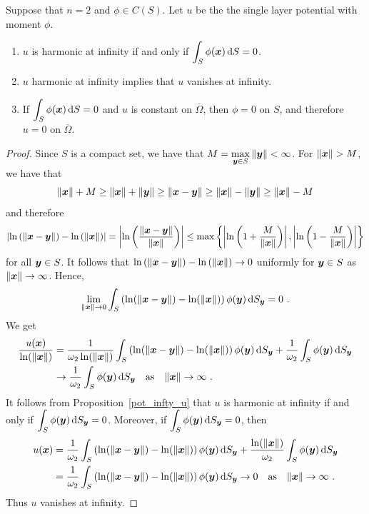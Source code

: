 \begin{lemma} \label{pot_1to1n2}
Suppose that $n=2$ and $\phi \in C(S)$.  Let $u$ be the
the single layer potential with moment $\phi$.
\begin{enumerate}
\item $u$ is harmonic at infinity if and only if
$\displaystyle \int_{S} \phi({\bm{x}}) \,\mathrm{d}{S} =0$.
\item $u$ harmonic at infinity implies that $u$ vanishes at infinity.
\item If $\displaystyle \int_{S} \phi({\bm{x}}) \,\mathrm{d}{S} =0$
and $u$ is constant on $\overline{\Omega}$, then $\phi=0$ on
$S$, and therefore $u=0$ on $\overline{\Omega}$.
\end{enumerate}
\end{lemma}

\begin{proof}
Since $S$ is a compact set, we have that
$\displaystyle M = \max_{{\bm{y}} \in S} \|{\bm{y}}\| < \infty$.
For $\|{\bm{x}}\| > M$, we have that
\[
\|{\bm{x}}\| + M \geq \|{\bm{x}}\| + \|{\bm{y}}\| \geq \|{\bm{x}} - {\bm{y}} \|
\geq \|{\bm{x}}\| - \|{\bm{y}}\|
\geq \|{\bm{x}}\| - M
\]
and therefore
\[
\left| \ln\left(\|{\bm{x}}-{\bm{y}}\|\right) -
\ln\left(\|{\bm{x}}\|\right) \right|
= \left| \ln\left(\frac{\|{\bm{x}}-{\bm{y}}\|}{\|{\bm{x}}\|}\right) \right|
\leq \max \left\{
\left| \ln\left(1 + \frac{M}{\|{\bm{x}}\|}\right) \right|,
\left| \ln\left(1 - \frac{M}{\|{\bm{x}}\|}\right) \right| \right\}
\]
for all ${\bm{y}} \in S$.   It follows that
$\ln\left(\|{\bm{x}}-{\bm{y}}\|\right) - \ln\left(\|{\bm{x}}\|\right) \to 0$
uniformly for ${\bm{y}} \in S$ as $\|{\bm{x}}\| \to \infty$.
Hence,
\[
\lim_{\|{\bm{x}}\|\to 0} \int_S \left( \ln(\|{\bm{x}}-{\bm{y}}\|) - \ln(\|{\bm{x}}\|)
\right) \phi({\bm{y}}) \,\mathrm{d}{S}_{{\bm{y}}} = 0 \ .
\]
We get
\begin{align*}
\frac{u({\bm{x}})}{\ln(\|{\bm{x}}\|)}
&= \frac{1}{\omega_2 \ln(\|{\bm{x}}\|)}
\int_S \left( \ln(\|{\bm{x}}-{\bm{y}}\|) - \ln(\|{\bm{x}}\|)
\right) \phi({\bm{y}}) \,\mathrm{d}{S}_{{\bm{y}}}
+ \frac{1}{\omega_2} \int_S \phi({\bm{y}}) \,\mathrm{d}{S}_{{\bm{y}}} \\
&\to \frac{1}{\omega_2} \int_S \phi({\bm{y}}) \,\mathrm{d}{S}_{{\bm{y}}}
\quad \text{as} \quad \|{\bm{x}}\| \to \infty \ .
\end{align*}
It follows from Proposition~\ref{pot_infty_u} that $u$ is harmonic at
infinity if and only if
$\displaystyle \int_S \phi({\bm{y}}) \,\mathrm{d}{S}_{{\bm{y}}} = 0$.
Moreover, if $\displaystyle \int_S \phi({\bm{y}}) \,\mathrm{d}{S}_{{\bm{y}}} = 0$, then
\begin{align*}
u({\bm{x}})
&= \frac{1}{\omega_2}
\int_S \left( \ln(\|{\bm{x}}-{\bm{y}}\|) - \ln(\|{\bm{x}}\|)
\right) \phi({\bm{y}}) \,\mathrm{d}{S}_{{\bm{y}}}
+ \frac{\ln(\|{\bm{x}}\|)}{\omega_2} \int_S \phi({\bm{y}}) \,\mathrm{d}{S}_{{\bm{y}}} \\
&= \frac{1}{\omega_2}
\int_S \left( \ln(\|{\bm{x}}-{\bm{y}}\|) - \ln(\|{\bm{x}}\|)
\right) \phi({\bm{y}}) \,\mathrm{d}{S}_{{\bm{y}}}
\to 0 \quad \text{as} \quad \|{\bm{x}}\| \to \infty \ .
\end{align*}
Thus $u$ vanishes at infinity.


\end{proof}

